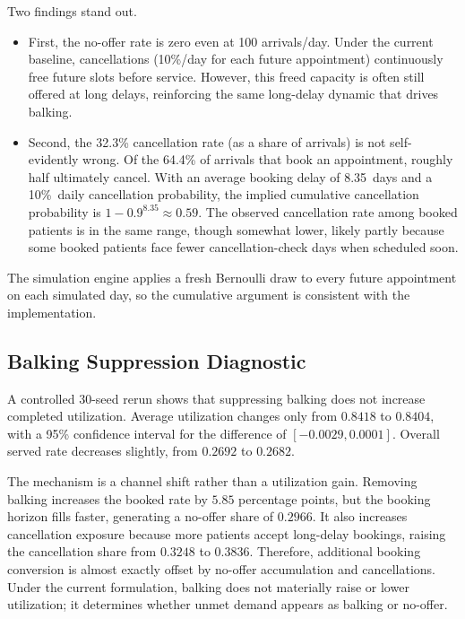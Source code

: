 \documentclass[11pt]{article}
\begin{document}
Two findings stand out. 
\begin{itemize}
    \item First, the no-offer rate is zero even at 100
arrivals/day. Under the current baseline, cancellations
(10\%/day for each future appointment) continuously free future slots before
service. However, this freed capacity is often still offered at long delays,
reinforcing the same long-delay dynamic that drives balking.

\item Second, the 32.3\% cancellation rate (as a share of arrivals) is not
self-evidently wrong. Of the 64.4\% of arrivals that book an appointment,
roughly half ultimately cancel. With an average booking delay of 8.35~days
and a 10\%~daily cancellation probability, the implied cumulative
cancellation probability is $1 - 0.9^{8.35} \approx 0.59$. The observed
cancellation rate among booked patients is in the same range, though
somewhat lower, likely partly because some booked patients face fewer
cancellation-check days when scheduled soon.
\end{itemize}

The simulation engine applies a
fresh Bernoulli draw to every future appointment on each simulated day, so the
cumulative argument is consistent with the implementation.

\subsection{Balking Suppression Diagnostic}
\label{sec:balk-suppression}

A controlled 30-seed rerun shows that suppressing balking does not increase
completed utilization. Average utilization changes only from \(0.8418\) to
\(0.8404\), with a 95\% confidence interval for the difference of
\([-0.0029,0.0001]\). Overall served rate decreases slightly, from
\(0.2692\) to \(0.2682\).

The mechanism is a channel shift rather than a utilization gain. Removing
balking increases the booked rate by \(5.85\) percentage points, but the
booking horizon fills faster, generating a no-offer share of \(0.2966\). It
also increases cancellation exposure because more patients accept long-delay
bookings, raising the cancellation share from \(0.3248\) to \(0.3836\).
Therefore, additional booking conversion is almost exactly offset by no-offer
accumulation and cancellations. Under the current formulation, balking does
not materially raise or lower utilization; it determines whether unmet demand
appears as balking or no-offer.
\end{document}
